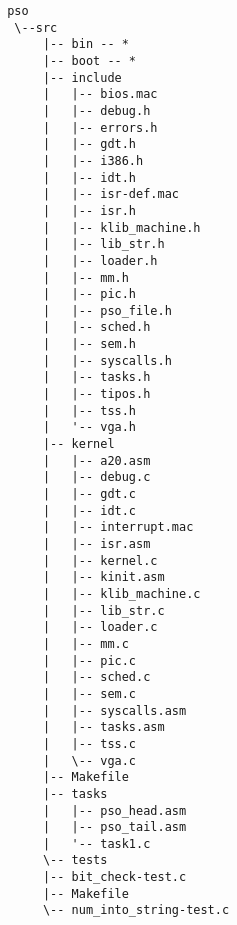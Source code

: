 \documentclass[a4paper]{article}
\begin{document}
\begin{multicols}{2}
\begin{verbatim}
 pso
  \--src
      |-- bin -- *
      |-- boot -- *
      |-- include
      |   |-- bios.mac
      |   |-- debug.h
      |   |-- errors.h
      |   |-- gdt.h
      |   |-- i386.h
      |   |-- idt.h
      |   |-- isr-def.mac
      |   |-- isr.h
      |   |-- klib_machine.h
      |   |-- lib_str.h
      |   |-- loader.h
      |   |-- mm.h
      |   |-- pic.h
      |   |-- pso_file.h
      |   |-- sched.h
      |   |-- sem.h
      |   |-- syscalls.h
      |   |-- tasks.h
      |   |-- tipos.h
      |   |-- tss.h
      |   '-- vga.h
      |-- kernel
      |   |-- a20.asm
      |   |-- debug.c
      |   |-- gdt.c
      |   |-- idt.c
      |   |-- interrupt.mac
      |   |-- isr.asm
      |   |-- kernel.c
      |   |-- kinit.asm
      |   |-- klib_machine.c
      |   |-- lib_str.c
      |   |-- loader.c
      |   |-- mm.c
      |   |-- pic.c
      |   |-- sched.c
      |   |-- sem.c
      |   |-- syscalls.asm
      |   |-- tasks.asm
      |   |-- tss.c
      |   \-- vga.c
      |-- Makefile
      |-- tasks
      |   |-- pso_head.asm
      |   |-- pso_tail.asm
      |   '-- task1.c
      \-- tests
	  |-- bit_check-test.c
	  |-- Makefile
	  \-- num_into_string-test.c
\end{verbatim}
\end{multicols}
\end{document}
